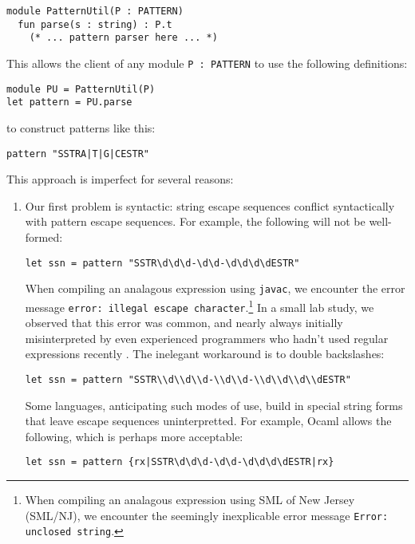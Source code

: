 \begin{lstlisting}[numbers=none]
module PatternUtil(P : PATTERN)
  fun parse(s : string) : P.t
    (* ... pattern parser here ... *)
\end{lstlisting}
This allows the client of any module \lstinline{P : PATTERN} to use the following definitions:
\begin{lstlisting}[numbers=none]
module PU = PatternUtil(P)
let pattern = PU.parse
\end{lstlisting}
to construct patterns like this:
\begin{lstlisting}[numbers=none]
pattern "SSTRA|T|G|CESTR"
\end{lstlisting}
This approach is imperfect for several reasons:
\begin{enumerate} 
\item Our first problem is syntactic: string escape sequences conflict syntactically with pattern escape sequences. For example, the following will not be well-formed:
\begin{lstlisting}[numbers=none,mathescape=|]
let ssn = pattern "SSTR\d\d\d-\d\d-\d\d\d\dESTR"
\end{lstlisting}
When compiling an analagous expression using \verb|javac|, we encounter the error message \verb|error: illegal escape character|.\footnote{When compiling an analagous expression using SML of New Jersey (SML/NJ), we encounter the seemingly inexplicable error message \texttt{Error: unclosed string}.} In a small lab study, we observed that this error was common, and nearly always initially misinterpreted by even experienced programmers who hadn't used regular expressions recently \cite{Omar:2012:ACC:2337223.2337324}. The inelegant workaround is to  double backslashes:
\begin{lstlisting}[numbers=none]
let ssn = pattern "SSTR\\d\\d\\d-\\d\\d-\\d\\d\\d\\dESTR"
\end{lstlisting}

Some languages, anticipating such modes of use, build in special string forms that leave escape sequences uninterpretted. For example, Ocaml allows the following, which is perhaps more acceptable:
\begin{lstlisting}[numbers=none]
let ssn = pattern {rx|SSTR\d\d\d-\d\d-\d\d\d\dESTR|rx}
\end{lstlisting}


\end{enumerate}

